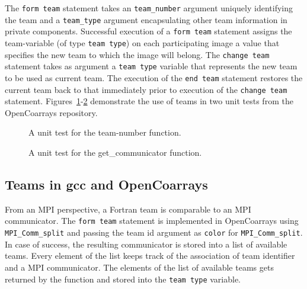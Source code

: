 The \texttt{form team} statement takes an \texttt{team\_number} argument uniquely identifying the team and
a \texttt{team\_type} argument encapsulating other team information in private components.
Successful execution of a \texttt{form team} statement assigns the team-variable (of type \texttt{team type}) on each
participating image a value that specifies the new team to which the image will belong.
The \texttt{change team} statement takes as argument a \texttt{team type} variable that represents the new team to be used as
current team. The execution of the \texttt{end team} statement restores the current team back
to that immediately prior to execution of the \texttt{change team} statement.
Figures~\ref{fig:team-number-test}-\ref{fig:get-communicator-test} demonstrate the use of teams in two
unit tests from the OpenCoarrays repository.

\begin{figure}
  
  \caption{A unit test for the team-number function.\label{fig:team-number-test}}
\end{figure}

\begin{figure}
  
  \caption{A unit test for the get\_communicator function.\label{fig:get-communicator-test}}
\end{figure}

\subsection{Teams in \gls{gcc} and OpenCoarrays}\label{subsec:teams-in-gcc}
From an MPI perspective, a Fortran team is comparable to an MPI communicator. The \texttt{form team} statement is implemented in OpenCoarrays
using \texttt{MPI\_Comm\_split} and passing the team id argument as \texttt{color} for \texttt{MPI\_Comm\_split}.
In case of success, the resulting communicator is stored into a list of available teams.
Every element of the list keeps track of the association of team identifier and a MPI communicator.
The elements of the list of available teams gets returned by the function and stored into the \texttt{team type} variable.

